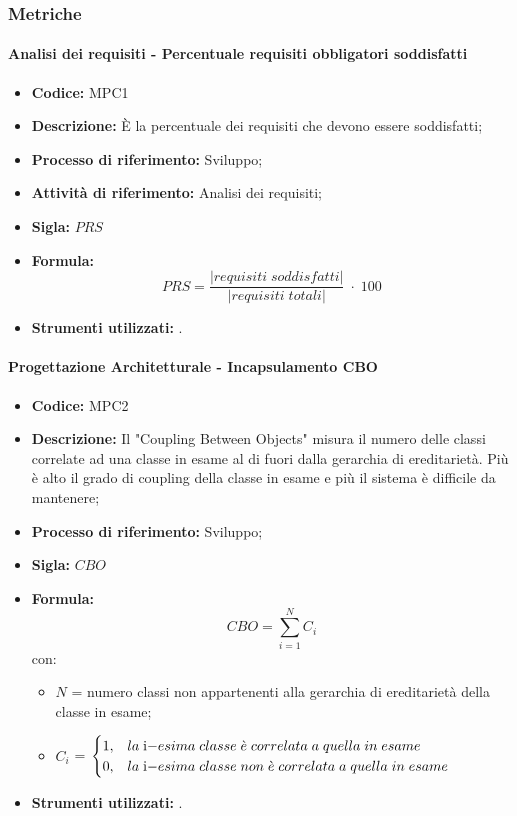 \subsubsection{Metriche}
    \paragraph{Analisi dei requisiti - Percentuale requisiti obbligatori soddisfatti}
    \begin{itemize}
        \item \textbf{Codice:} MPC1
        \item \textbf{Descrizione:} È la percentuale dei requisiti che devono essere soddisfatti;
        \item \textbf{Processo di riferimento:} Sviluppo;
        \item \textbf{Attività di riferimento:} Analisi dei requisiti;
        \item \textbf{Sigla:} $PRS$
        \item \textbf{Formula:} $$PRS = {\frac{|requisiti \; soddisfatti|}{|requisiti \; totali|}}\; \cdot \; 100$$
        \item \textbf{Strumenti utilizzati:} .
    \end{itemize}
\paragraph{Progettazione Architetturale - Incapsulamento CBO}
    \begin{itemize}
        \item \textbf{Codice:} MPC2
        \item \textbf{Descrizione:} Il "Coupling Between Objects" misura il numero delle classi correlate ad una classe in esame al di fuori dalla gerarchia di ereditarietà. Più è alto il grado di coupling della classe in esame e più il sistema è difficile da mantenere;
        \item \textbf{Processo di riferimento:} Sviluppo;
        \item \textbf{Sigla:} $CBO$
        \item \textbf{Formula:} $$CBO = {\sum_{i=1}^{N} C_i}$$
        con:
        \begin{itemize}
            \item $N$ = numero classi non appartenenti alla gerarchia di ereditarietà della classe in esame;
            \item $C_i$ =
            \begin{math} {
                \begin{cases}
                    1, & la \; $i$-esima \; classe \; \grave{e} \; correlata \; a \; quella \; in \; esame \\
                    0, & la \; $i$-esima \; classe \; non \; \grave{e} \; correlata \; a \; quella \; in \; esame
                \end{cases}
            }
            \end{math}
        \end{itemize}
        \item \textbf{Strumenti utilizzati:} .
    \end{itemize}
